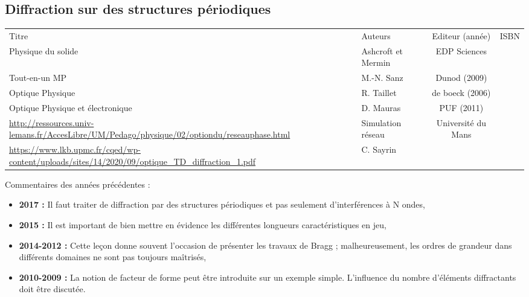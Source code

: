\begin{headerBlock}
  \chapter{Diffraction sur des structures périodiques}
    \label{LP_DiffractionPeriodique}
\end{headerBlock}

\begin{center}
\begin{tabularx}{\textwidth}{| X | X | c | c |}
  \hline
  \rowcolor{gray!20}\multicolumn{4}{c}{Bibliographie de la leçon : } \\
  \hline 
  Titre & Auteurs & Editeur (année) & ISBN \\
  \hline
   Physique du solide & Ashcroft et Mermin & EDP Sciences &   \\
  \hline 
   Tout-en-un MP & M.-N. Sanz & Dunod (2009) &  \\
  \hline 
  Optique Physique & R. Taillet & de boeck (2006) & \\
  \hline 
  Optique Physique et électronique & D. Mauras & PUF (2011) & \\
  \hline
  \url{http://ressources.univ-lemans.fr/AccesLibre/UM/Pedago/physique/02/optiondu/reseauphase.html} & Simulation réseau & Université du Mans & \\
  \hline
  \url{https://www.lkb.upmc.fr/cqed/wp-content/uploads/sites/14/2020/09/optique_TD_diffraction_1.pdf} & C. Sayrin & & \\
  \hline
\end{tabularx}
\end{center}

\begin{reportBlock}{Commentaires des années précédentes :}
    \begin{itemize}
        \item \textbf{2017 :} Il faut traiter de diffraction par des structures périodiques et pas seulement d’interférences à N ondes,
        \item \textbf{2015 :} Il est important de bien mettre en évidence les différentes longueurs caractéristiques en jeu,
        \item \textbf{2014-2012 :} Cette leçon donne souvent l’occasion de présenter les travaux de Bragg ; malheureusement, les ordres de grandeur dans différents domaines ne sont pas toujours maîtrisés,
        \item \textbf{2010-2009 :} La notion de facteur de forme peut être introduite sur un exemple simple. L’influence du nombre d’éléments diffractants doit être discutée.
    \end{itemize}
\end{reportBlock}

